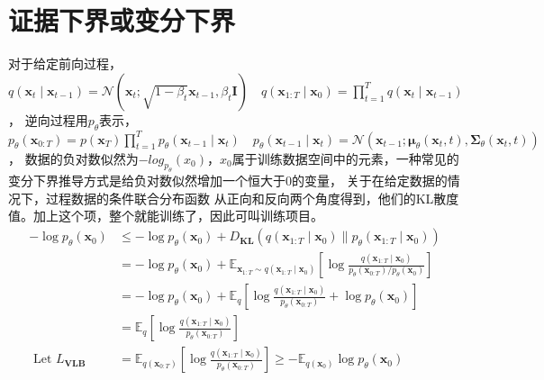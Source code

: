 \section{证据下界或变分下界}
对于给定前向过程，
$q\left(\mathbf{x}_t \mid \mathbf{x}_{t-1}\right)=\mathcal{N}\left(\mathbf{x}_t ; \sqrt{1-\beta_t} \mathbf{x}_{t-1},
\beta_t \mathbf{I}\right) \quad q\left(\mathbf{x}_{1: T} \mid \mathbf{x}_0\right)=
\prod_{t=1}^T q\left(\mathbf{x}_t \mid \mathbf{x}_{t-1}\right)$，
逆向过程用$p_{\theta}$表示，
$p_\theta\left(\mathbf{x}_{0: T}\right)=p\left(\mathbf{x}_T\right)
\prod_{t=1}^T p_\theta\left(\mathbf{x}_{t-1} \mid \mathbf{x}_t\right) \quad p_\theta\left(\mathbf{x}_{t-1} \mid \mathbf{x}_t\right)=
\mathcal{N}\left(\mathbf{x}_{t-1} ;
\boldsymbol{\mu}_\theta\left(\mathbf{x}_t, t\right), \mathbf{\Sigma}_\theta\left(\mathbf{x}_t, t\right)\right)
$，
数据的负对数似然为$-log_{p_{\theta}}(x_0)$，$x_0$属于训练数据空间中的元素，一种常见的变分下界推导方式是给负对数似然增加一个恒大于0的变量，
关于在给定数据的情况下，过程数据的条件联合分布函数 从正向和反向两个角度得到，他们的KL散度值。加上这个项，整个就能训练了，因此可叫训练项目。
\begin{equation}
  \begin{aligned}
    -\log p_\theta\left(\mathbf{x}_0\right)
    & \leq-\log p_\theta\left(\mathbf{x}_0\right)+D_{\mathbf{KL}}\left(q\left(\mathbf{x}_{1: T} \mid \mathbf{x}_0\right) \| p_\theta\left(\mathbf{x}_{1: T} \mid \mathbf{x}_0\right)\right) \\
    & =-\log p_\theta\left(\mathbf{x}_0\right)+\mathbb{E}_{\mathbf{x}_{1: T} \sim q\left(\mathbf{x}_{1: T} \mid \mathbf{x}_0\right)}\left[\log \frac{q\left(\mathbf{x}_{1: T}
    \mid \mathbf{x}_0\right)}{p_\theta\left(\mathbf{x}_{0: T}\right) / p_\theta\left(\mathbf{x}_0\right)}\right] \\
    & =-\log p_\theta\left(\mathbf{x}_0\right)+\mathbb{E}_q\left[\log \frac{q\left(\mathbf{x}_{1: T} \mid \mathbf{x}_0\right)}{p_\theta\left(\mathbf{x}_{0: T}\right)}+\log p_\theta\left(\mathbf{x}_0\right)\right] \\
    & =\mathbb{E}_q\left[\log \frac{q\left(\mathbf{x}_{1: T} \mid \mathbf{x}_0\right)}{p_\theta\left(\mathbf{x}_{0: T}\right)}\right] \\ \text { Let } L_{\mathbf{VLB}} & =\mathbb{E}_{q\left(\mathbf{x}_{0: T}\right)}
    \left[\log \frac{q\left(\mathbf{x}_{1: T} \mid \mathbf{x}_0\right)}{p_\theta\left(\mathbf{x}_{0: T}\right)}\right]
    \geq-\mathbb{E}_{q\left(\mathbf{x}_0\right)} \log p_\theta\left(\mathbf{x}_0\right)
  \end{aligned}
\end{equation}

